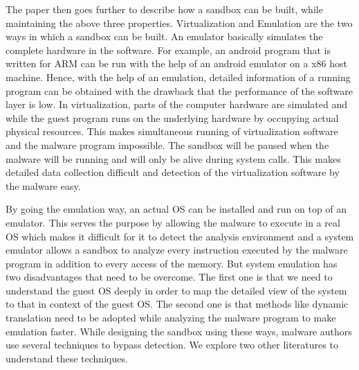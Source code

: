 \documentclass[11pt]{article}
\begin{document}
		The paper then goes further to describe how a sandbox can be built, while maintaining the above three properties. Virtualization and Emulation are the two ways in which a sandbox can be built. An emulator basically simulates the complete hardware in the software. For example, an android program that is written for ARM can be run with the help of an android emulator on a x86 host machine. Hence, with the help of an emulation, detailed information of a running program can be obtained with the drawback that the performance of the software layer is low. In virtualization, parts of the computer hardware are simulated and while the guest program runs on the underlying hardware by occupying actual physical resources. This makes simultaneous running of virtualization software and the malware program impossible. The sandbox will be paused when the malware will be running and will only be alive during system calls. This makes detailed data collection difficult and detection of the virtualization software by the malware easy.

		By going the emulation way, an actual OS can be installed and run on top of an emulator. This serves the purpose by allowing the malware to execute in a real OS which makes it difficult for it to detect the analysis environment and a system emulator allows a sandbox to analyze every instruction executed by the malware program in addition to every access of the memory. But system emulation has two disadvantages that need to be overcome. The first one is that we need to understand the guest OS deeply in order to map the detailed view of the system to that in context of the guest OS. The second one is that methods like dynamic translation need to be adopted while analyzing the malware program to make emulation faster. While designing the sandbox using these ways, malware authors use several techniques to bypass detection. We explore two other literatures to understand these techniques.
		
\end{document}
